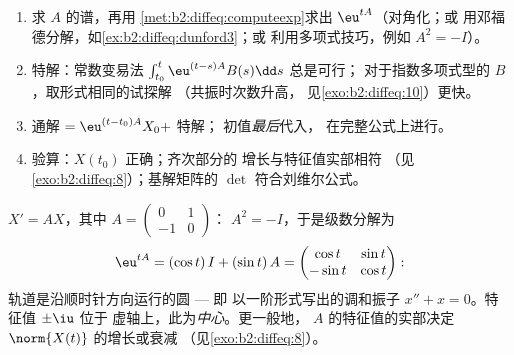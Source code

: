 \begin{method}[从头到尾求解 $X' = AX + B(t)$]\label{met:b2:diffeq:solvelinear}
\begin{enumerate}
  \item 求 $A$ 的谱，再用
        \cref{met:b2:diffeq:computeexp}求出 $\eu^{tA}$（对角化；或
        用邓福德分解，如\cref{ex:b2:diffeq:dunford3}；或
        利用多项式技巧，例如 $A^2 = -I$）。
  \item 特解：常数变易法
        $\int_{t_0}^t\eu^{(t-s)A}B(s)\dd s$ 总是可行；
        对于指数多项式型的 $B$，取形式相同的试探解
        （共振时次数升高，
        见\cref{exo:b2:diffeq:10}）更快。
  \item 通解 $= \eu^{(t-t_0)A}X_0 +$ 特解；
        初值\emph{最后}代入，
        在完整公式上进行。
  \item 验算：$X(t_0)$ 正确；齐次部分的
        增长与特征值实部相符
        （见\cref{exo:b2:diffeq:8}）；基解矩阵的 $\det$
        符合刘维尔公式。
\end{enumerate}
\end{method}

\begin{example}[相图示例]\label{ex:b2:diffeq:phaseportrait}
$X' = AX$，其中 $A = \begin{pmatrix} 0 & 1\\ -1 & 0\end{pmatrix}$：
$A^2 = -I$，于是级数分解为
\[
\eu^{tA} = (\cos t)\,I + (\sin t)\,A
= \begin{pmatrix} \cos t & \sin t\\ -\sin t & \cos t
\end{pmatrix} :
\]
轨道是沿顺时针方向运行的圆 --- 即
以一阶形式写出的调和振子 $x'' + x = 0$。特征值 $\pm\iu$ 位于
虚轴上，此为\emph{中心}。更一般地，
$A$ 的特征值的实部决定 $\norm{X(t)}$ 的增长或衰减
（见\cref{exo:b2:diffeq:8}）。
\end{example}

